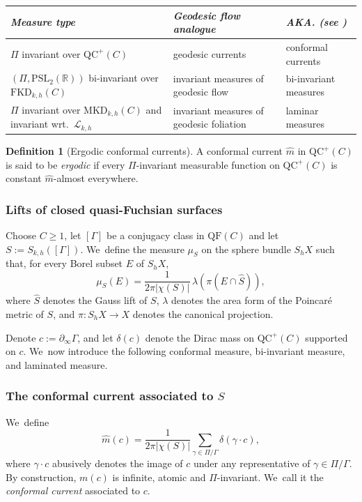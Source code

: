 \documentclass[10pt]{amsart}
\theoremstyle{plain}
\theoremstyle{definition}
\newtheorem{defi}[theorem]{Definition}
\newcommand\PSL{\mathrm{PSL}_2(\mathbb{R})}
\newcommand{\cL}{{\mathcal L}}
\newcommand{\QF}{\mathrm{QF}}
\newcommand{\QC}{\mathrm{QC}}
\newcommand{\MKD}{\mathrm{MKD}}
\newcommand{\FKD}{\mathrm{FKD}}
\newcommand{\bord}{\partial_{\infty}}
\begin{document}
\medskip
\begin{center}
\begin{tabularx}{\textwidth}{|>{\raggedright\arraybackslash}p{5cm}
|>{\raggedright\arraybackslash}X
|>{\raggedright\arraybackslash}X|}
\hline
\small\emph{Measure type} &
\small\emph{Geodesic flow analogue} &
\small\emph{AKA. (see \cite{LabourieBourbaki,MN_currents})} \\
\hline
\small $\Pi$ invariant over $\QC^+(C)$ &
\small geodesic currents &
\small conformal currents \\
\small $(\Pi,\PSL)$ bi-invariant over $\FKD_{k,h}(C)$ &
\small invariant measures of geodesic flow &
\small bi-invariant measures \\
\small $\Pi$ invariant over $\MKD_{k,h}(C)$ and invariant wrt.\ $\cL_{k,h}$ &
\small invariant measures of geodesic foliation &
\small laminar measures \\
\hline
\end{tabularx}
\end{center}

\begin{defi}[Ergodic conformal currents]
A conformal current $\hat m$ in $\QC^+(C)$ is said to be \emph{ergodic} if every $\Pi$-invariant measurable function on $\QC^+(C)$ is constant $\hat m$-almost everywhere.
\end{defi}

\subsubsection{Lifts of closed quasi-Fuchsian surfaces}\label{sss.lifts} Choose $C\geq 1$, let $[\Gamma]$ be a conjugacy class in $\QF(C)$ and let $S:=S_{k,h}([\Gamma])$. We~define the measure $\mu_S$ on the sphere bundle $S_h X$ such that, for every Borel subset $E$ of $S_h X$,
\begin{equation}\label{eq.inv_measure}
\mu_S(E)=\frac{1}{2\pi|\chi(S)|}\,\lambda(\pi(E\cap\hat S)),
\end{equation}
where $\hat S$ denotes the Gauss lift of $S$, $\lambda$ denotes the area form of the Poincaré metric of $S$, and $\pi:S_hX\to X$ denotes the canonical projection.

Denote $c:=\bord\Gamma$, and let $\delta(c)$ denote the Dirac mass on $\QC^+(C)$ supported on $c$. We~now introduce the following conformal measure, bi-invariant measure, and laminated measure.

\subsubsection*{The conformal current associated to $S$}
We~define
\begin{equation*}
\hat m(c)=\frac{1}{2\pi|\chi(S)|}\sum_{\gamma\in\Pi/\Gamma}\delta(\gamma\cdot c),
\end{equation*}
where $\gamma\cdot c$ abusively denotes the image of $c$ under any representative of $\gamma\in\Pi/\Gamma$. By construction, $m(c)$ is infinite, atomic and $\Pi$-invariant. We~call it the \emph{conformal current} associated to $c$.
\end{document}
